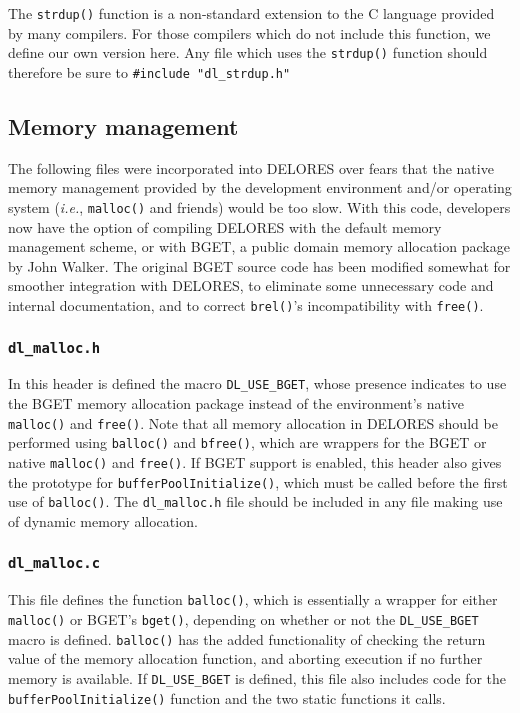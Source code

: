 \documentclass[a4paper,10pt,twocolumn]{article}
\begin{document}
The \texttt{strdup()} function is a non-standard extension to the C
language provided by many compilers.  For those compilers which do not
include this function, we define our own version here.  Any file which
uses the \texttt{strdup()} function should therefore be sure to
\texttt{\#include "dl\_strdup.h"}

\subsection{Memory management}

The following files were incorporated into DELORES over fears that the
native memory management provided by the development environment
and/or operating system (\textit{i.e.}, \texttt{malloc()} and friends)
would be too slow.  With this code, developers now have the option of
compiling DELORES with the default memory management scheme, or with
BGET, a public domain memory allocation package by John Walker. The
original BGET source code has been modified somewhat for smoother
integration with DELORES, to eliminate some unnecessary code and
internal documentation, and to correct \texttt{brel()}'s
incompatibility with \texttt{free()}.

\subsubsection{\texttt{dl\_malloc.h}}
  
In this header is defined the macro \texttt{DL\_USE\_BGET}, whose
presence indicates to use the BGET memory allocation package instead
of the environment's native \texttt{malloc()} and \texttt{free()}.
Note that all memory allocation in DELORES should be performed using
\texttt{balloc()} and \texttt{bfree()}, which are wrappers for the
BGET or native \texttt{malloc()} and \texttt{free()}. If BGET support
is enabled, this header also gives the prototype for
\texttt{bufferPoolInitialize()}, which must be called before the first
use of \texttt{balloc()}. The \texttt{dl\_malloc.h} file should be
included in any file making use of dynamic memory allocation.

\subsubsection{\texttt{dl\_malloc.c}}
  
This file defines the function \texttt{balloc()}, which is essentially
a wrapper for either \texttt{malloc()} or BGET's \texttt{bget()},
depending on whether or not the \texttt{DL\_USE\_BGET} macro is
defined. \texttt{balloc()} has the added functionality of checking the
return value of the memory allocation function, and aborting execution
if no further memory is available.  If \texttt{DL\_USE\_BGET} is
defined, this file also includes code for the
\texttt{bufferPoolInitialize()} function and the two static functions
it calls.
  
\end{document}
